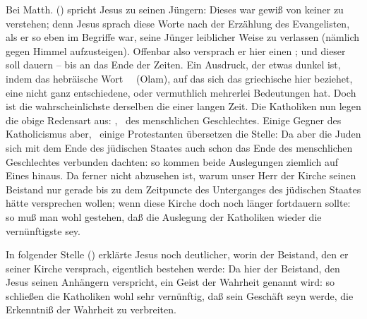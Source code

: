 \begin{aufza}
\item Bei Matth. () spricht Jesus zu seinen Jüngern:  Dieses  war gewiß von keiner  zu verstehen; denn Jesus sprach diese Worte nach der Erzählung des Evangelisten, als er so eben im Begriffe war, seine Jünger leiblicher Weise zu verlassen (nämlich gegen Himmel aufzusteigen). Offenbar also versprach er hier einen ; und dieser soll dauern -- bis an das Ende der Zeiten. Ein Ausdruck, der etwas dunkel ist, indem das hebräische Wort~\   (Olam), auf das sich das griechische  hier beziehet, eine nicht ganz entschiedene, oder vermuthlich mehrerlei Bedeutungen hat. Doch ist die wahrscheinlichste derselben die einer langen Zeit. Die Katholiken nun legen die obige Redensart aus: , \dh\ des menschlichen Geschlechtes. Einige Gegner des Katholicismus aber, \zB\ einige Protestanten übersetzen die Stelle:  Da aber die Juden sich mit dem Ende des jüdischen Staates auch schon das Ende des menschlichen Geschlechtes verbunden dachten: so kommen beide Auslegungen ziemlich auf Eines hinaus. Da ferner nicht abzusehen ist, warum unser Herr der Kirche seinen Beistand nur gerade bis zu dem Zeitpuncte des Unterganges des jüdischen Staates hätte versprechen wollen; wenn diese Kirche doch noch länger fortdauern sollte: so muß man wohl gestehen, daß die Auslegung der Katholiken wieder die vernünftigste sey.
\item In folgender Stelle () erklärte Jesus noch deutlicher, worin der Beistand, den er seiner Kirche versprach, eigentlich bestehen werde:  Da hier der Beistand, den Jesus seinen Anhängern verspricht, ein Geist der Wahrheit genannt wird: so schließen die Katholiken wohl sehr vernünftig, daß sein Geschäft seyn werde, die Erkenntniß der Wahrheit zu verbreiten.

\end{aufza}
